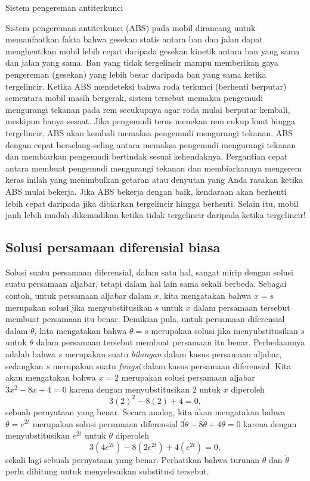 \noindent\begin{digression}{Sistem pengereman antiterkunci}

\noindent Sistem pengereman antiterkunci (ABS) pada mobil dirancang
untuk memanfaatkan fakta bahwa gesekan statis antara ban dan jalan
dapat menghentikan mobil lebih cepat daripada gesekan kinetik antara
ban yang sama dan jalan yang sama. Ban yang tidak tergelincir mampu
memberikan gaya pengereman (gesekan) yang lebih besar daripada ban
yang sama ketika tergelincir. Ketika ABS mendeteksi bahwa roda terkunci
(berhenti berputar) sementara mobil masih bergerak, sistem tersebut
memaksa pengemudi mengurangi tekanan pada rem secukupnya agar roda
mulai berputar kembali, meskipun hanya sesaat. Jika pengemudi terus
menekan rem cukup kuat hingga tergelincir, ABS akan kembali memaksa
pengemudi mengurangi tekanan. ABS dengan cepat berselang-seling antara
memaksa pengemudi mengurangi tekanan dan membiarkan pengemudi bertindak
sesuai kehendaknya. Pergantian cepat antara membuat pengemudi mengurangi
tekanan dan membiarkannya mengerem keras inilah yang menimbulkan getaran
atau denyutan yang Anda rasakan ketika ABS mulai bekerja. Jika ABS
bekerja dengan baik, kendaraan akan berhenti lebih cepat daripada
jika dibiarkan tergelincir hingga berhenti. Selain itu, mobil jauh
lebih mudah dikemudikan ketika tidak tergelincir daripada ketika tergelincir! 

\noindent\end{digression}

\subsection{Solusi persamaan diferensial biasa}

Solusi suatu persamaan diferensial, dalam satu hal, sangat mirip dengan
solusi suatu persamaan aljabar, tetapi dalam hal lain sama sekali
berbeda. Sebagai contoh, untuk persamaan aljabar dalam $x$, kita
mengatakan bahwa $x=s$ merupakan solusi jika menyubstitusikan $s$
untuk $x$ dalam persamaan tersebut membuat persamaan itu benar. Demikian
pula, untuk persamaan diferensial dalam $\theta$, kita mengatakan
bahwa $\theta=s$ merupakan solusi jika menyubstitusikan $s$ untuk
$\theta$ dalam persamaan tersebut membuat persamaan itu benar. Perbedaannya
adalah bahwa $s$ merupakan suatu \textit{bilangan} dalam kasus persamaan
aljabar, sedangkan $s$ merupakan suatu \textit{fungsi} dalam kasus
persamaan diferensial. Kita akan mengatakan bahwa $x=2$ merupakan
solusi persamaan aljabar $3x^{2}-8x+4=0$ karena dengan menyubstitusikan
$2$ untuk $x$ diperoleh
\[
3(2)^{2}-8(2)+4=0,
\]
sebuah pernyataan yang benar. Secara analog, kita akan mengatakan
bahwa $\theta=e^{2t}$ merupakan solusi persamaan diferensial $3\ddot{\theta}-8\dot{\theta}+4\theta=0$
karena dengan menyubstitusikan $e^{2t}$ untuk $\theta$ diperoleh
\[
3(4e^{2t})-8(2e^{2t})+4(e^{2t})=0,
\]
sekali lagi sebuah pernyataan yang benar. Perhatikan bahwa turunan
$\dot{\theta}$ dan $\ddot{\theta}$ perlu dihitung untuk menyelesaikan
substitusi tersebut.

